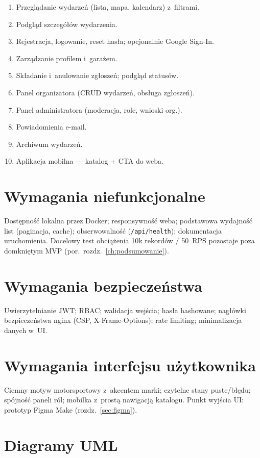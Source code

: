 \documentclass{sprz}
\begin{document}
\begin{enumerate}  
 \item Przeglądanie wydarzeń (lista, mapa, kalendarz) z~filtrami.  
 \item Podgląd szczegółów wydarzenia.  
 \item Rejestracja, logowanie, reset hasła; opcjonalnie Google Sign-In.  
 \item Zarządzanie profilem i~garażem.  
 \item Składanie i~anulowanie zgłoszeń; podgląd statusów.  
 \item Panel organizatora (CRUD wydarzeń, obsługa zgłoszeń).  
 \item Panel administratora (moderacja, role, wnioski org.).  
 \item Powiadomienia e-mail.  
 \item Archiwum wydarzeń.  
 \item Aplikacja mobilna --- katalog + CTA do weba.  
\end{enumerate}  
  
\section{Wymagania niefunkcjonalne}  
Dostępność lokalna przez Docker; responsywność weba; podstawowa wydajność list (paginacja, cache); obserwowalność (\texttt{/api/health}); dokumentacja uruchomienia. Docelowy test obciążenia 10k rekordów / 50~RPS pozostaje poza domkniętym MVP (por.\ rozdz.~\ref{ch:podsumowanie}).  
  
\section{Wymagania bezpieczeństwa}  
Uwierzytelnianie JWT; RBAC; walidacja wejścia; hasła hashowane; nagłówki bezpieczeństwa nginx (CSP, X-Frame-Options); rate limiting; minimalizacja danych w~UI.  
  
\section{Wymagania interfejsu użytkownika}  
Ciemny motyw motorsportowy z~akcentem marki; czytelne stany puste/błędu; spójność paneli ról; mobilka z~prostą nawigacją katalogu. Punkt wyjścia UI: prototyp Figma Make (rozdz.~\ref{sec:figma}).  
  
\section{Diagramy UML}  
\end{document}
